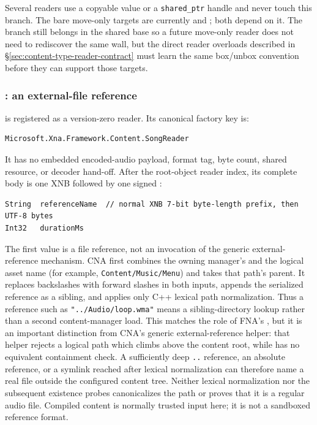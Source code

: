 Several readers use a copyable value or a \texttt{shared\_ptr} handle and never touch this branch.
The bare move-only targets are currently  and ;
both depend on it. The branch still belongs in the shared base so a future move-only reader does
not need to rediscover the same wall, but the direct reader overloads described in
\S\ref{sec:content-type-reader-contract} must learn the same box/unbox convention before they can
support those targets.

\subsubsection{: an external-file reference}
\label{sec:xnb-song-reader}

 is registered as a version-zero reader.  Its canonical factory key is:

\begin{lstlisting}
Microsoft.Xna.Framework.Content.SongReader
\end{lstlisting}

It has no embedded encoded-audio payload, format tag, byte count, shared resource, or decoder
hand-off.  After the root-object reader index, its complete body is one XNB 
followed by one signed :

\begin{lstlisting}
String  referenceName  // normal XNB 7-bit byte-length prefix, then UTF-8 bytes
Int32   durationMs
\end{lstlisting}

The first value is a file reference, not an invocation of the generic external-reference
mechanism.  CNA first combines the owning manager's  and the logical asset
name (for example,
\texttt{Content/Music/Menu}) and takes that path's parent.  It replaces backslashes with forward
slashes in both inputs, appends the serialized reference as a sibling, and applies only C++ lexical
path normalization.  Thus a reference such as
\texttt{"../Audio/loop.wma"} means a sibling-directory lookup rather than a second content-manager
load.  This matches the role of FNA's , but it is an
important distinction from CNA's generic external-reference helper: that helper rejects a logical
path which climbs above the content root, while  has no equivalent containment
check.  A sufficiently deep \texttt{..} reference, an absolute reference, or a symlink reached
after lexical normalization can therefore name a real file outside the configured content tree.
Neither lexical normalization nor the subsequent existence probes canonicalizes the path or proves
that it is a regular audio file.  Compiled content is normally trusted input here; it is not a
sandboxed reference format.

